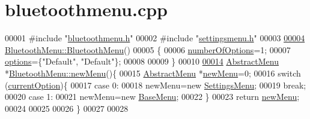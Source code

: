 \hypertarget{bluetoothmenu_8cpp_source}{}\section{bluetoothmenu.\+cpp}
\label{bluetoothmenu_8cpp_source}

\begin{DoxyCode}
00001 \textcolor{preprocessor}{#include "\hyperlink{bluetoothmenu_8h}{bluetoothmenu.h}"}
00002 \textcolor{preprocessor}{#include "\hyperlink{settingsmenu_8h}{settingsmenu.h}"}
00003 
\hypertarget{bluetoothmenu_8cpp_source.tex_l00004}{}\hyperlink{classBluetoothMenu_a164151dbccd288a092ddd35f23dfd778}{00004} \hyperlink{classBluetoothMenu_a164151dbccd288a092ddd35f23dfd778}{BluetoothMenu::BluetoothMenu}()
00005 \{
00006     \hyperlink{classAbstractMenu_a6caff7f6281c6c2912e5f808c2906123}{numberOfOptions}=1;
00007     \hyperlink{classAbstractMenu_a990dc4299fbe86152487fd35d46a403b}{options}=\{\textcolor{stringliteral}{"Default"}, \textcolor{stringliteral}{"Default"}\};
00008 
00009 \}
00010 
\hypertarget{bluetoothmenu_8cpp_source.tex_l00014}{}\hyperlink{classBluetoothMenu_a0fd16ad5a39ce3624613ad7834a55565}{00014} \hyperlink{classAbstractMenu}{AbstractMenu} *\hyperlink{classBluetoothMenu_a0fd16ad5a39ce3624613ad7834a55565}{BluetoothMenu::newMenu}()\{
00015     \hyperlink{classAbstractMenu}{AbstractMenu} *\hyperlink{classBluetoothMenu_a0fd16ad5a39ce3624613ad7834a55565}{newMenu}=0;
00016     \textcolor{keywordflow}{switch} (\hyperlink{classAbstractMenu_a589fea1bf68c33e0eff64c8b609cb980}{currentOption})\{
00017     \textcolor{keywordflow}{case} 0:
00018         newMenu=\textcolor{keyword}{new} \hyperlink{classSettingsMenu}{SettingsMenu};
00019         \textcolor{keywordflow}{break};
00020     \textcolor{keywordflow}{case} 1:
00021         newMenu=\textcolor{keyword}{new} \hyperlink{classBaseMenu_aac7431fdaecc0ecc3a0695511dc8426f}{BaseMenu};
00022     \}
00023     \textcolor{keywordflow}{return} \hyperlink{classBluetoothMenu_a0fd16ad5a39ce3624613ad7834a55565}{newMenu};
00024 
00025 
00026 \}
00027 
00028 
\end{DoxyCode}
